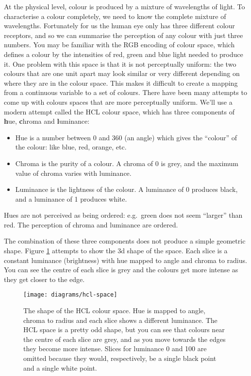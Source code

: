 At the physical level, colour is produced by a mixture of wavelengths of
light. To characterise a colour completely, we need to know the complete
mixture of wavelengths. Fortunately for us the human eye only has three
different colour receptors, and so we can summarise the perception of
any colour with just three numbers. You may be familiar with the RGB
encoding of colour space, which defines a colour by the intensities of
red, green and blue light needed to produce it. One problem with this
space is that it is not perceptually uniform: the two colours that are
one unit apart may look similar or very different depending on where
they are in the colour space. This makes it difficult to create a
mapping from a continuous variable to a set of colours. There have been
many attempts to come up with colours spaces that are more perceptually
uniform. We'll use a modern attempt called the HCL colour space, which
has three components of \textbf{h}ue, \textbf{c}hroma and
\textbf{l}uminance: 

\begin{itemize}
\item
  Hue is a number between 0 and 360 (an angle) which gives the
  ``colour'' of the colour: like blue, red, orange, etc.
\item
  Chroma is the purity of a colour. A chroma of 0 is grey, and the
  maximum value of chroma varies with luminance.
\item
  Luminance is the lightness of the colour. A luminance of 0 produces
  black, and a luminance of 1 produces white.
\end{itemize}

Hues are not perceived as being ordered: e.g.~green does not seem
``larger'' than red. The perception of chroma and luminance are ordered.

The combination of these three components does not produce a simple
geometric shape. Figure \ref{fig:hcl} attempts to show the 3d shape of
the space. Each slice is a constant luminance (brightness) with hue
mapped to angle and chroma to radius. You can see the centre of each
slice is grey and the colours get more intense as they get closer to the
edge.

\begin{figure}[htbp]
  \centering
    \texttt{[image: diagrams/hcl-space]}
  \caption{The shape of the HCL colour space.  Hue is mapped to angle, chroma to radius and each slice shows a different luminance.  The HCL space is a pretty odd shape, but you can see that colours near the centre of each slice are grey, and as you move towards the edges they become more intense.  Slices for luminance 0 and 100 are omitted because they would, respectively, be a single black point and a single white point.}
  \label{fig:hcl}
\end{figure}


